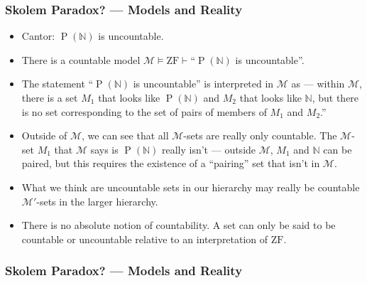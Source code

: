 \documentclass[UTF8,11pt,colorlinks,compress,openany]{beamer}%
\begin{document}
\begin{frame}\frametitle{Skolem Paradox? --- Models and Reality}
	\begin{itemize}
		\item Cantor: $\operatorname{P}(\mathbb{N})$ is uncountable.
		\item There is a countable model $\mathcal{M}\vDash \mathrm{ZF}\vdash$``$\operatorname{P}(\mathbb{N})$ is uncountable''.
		\item The statement ``$\operatorname{P}(\mathbb{N})$ is uncountable'' is interpreted in $\mathcal{M}$ as --- within $\mathcal{M}$, there is a set $M_1$ that looks like $\operatorname{P}(\mathbb{N})$ and $M_2$ that looks like $\mathbb{N}$, but there is no set corresponding to the set of pairs of members of $M_1$ and $M_2$.''
		\item Outside of $\mathcal{M}$, we can see that all $\mathcal{M}$-sets are really only countable. The $\mathcal{M}$-set $M_1$ that $\mathcal{M}$ says is $\operatorname{P}(\mathbb{N})$ really isn't --- outside $\mathcal{M}$, $M_1$ and $\mathbb{N}$ can be paired, but this requires the existence of a ``pairing'' set that isn't in $\mathcal{M}$.
		\item What we think are uncountable sets in our hierarchy may really be countable $\mathcal{M}'$-sets in the larger hierarchy.
		\item There is no absolute notion of countability. A set can only be said to be countable or uncountable relative to an interpretation of $\mathrm{ZF}$.
	\end{itemize}
\end{frame}

\begin{frame}\frametitle{Skolem Paradox? --- Models and Reality}\centering
{}
\end{frame}
\end{document}
